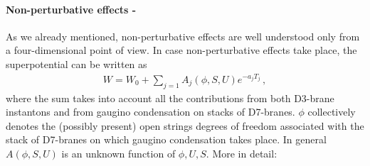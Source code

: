 \documentclass[12pt,a4paper]{book}
\begin{document}
\paragraph{Non-perturbative effects - } As we already mentioned, non-perturbative effects are well understood only from a four-dimensional point of view. In case non-perturbative effects take place, the superpotential can be written as~\cite{Blumenhagen:2006ci, Bergshoeff:2005yp, Lust:2005cu, Lust:2005dy, Lust:2006zg, Blumenhagen:2009qh}
\begin{align}
\label{eq:NonPerturbativeEffects}
W = W_0 + \sum_{j = 1} A_j (\phi, S,U) e^{-a_j T_j} \,,
\end{align}
where the sum takes into account all the contributions from both D3-brane instantons and from gaugino condensation on stacks of D7-branes. $\phi$ collectively denotes the (possibly present) open strings degrees of freedom associated with the stack of D7-branes on which gaugino condensation takes place. In general $A(\phi, S, U)$ is an unknown function of $\phi, U, S$. More in detail:
\end{document}
